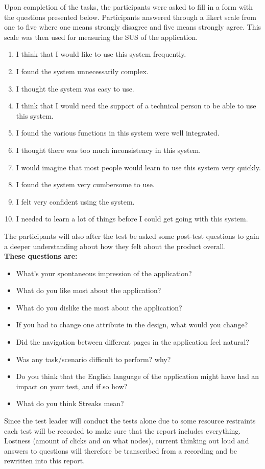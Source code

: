 \noindent Upon completion of the tasks, the participants were asked to fill in a form with the questions presented below. Participants answered through a likert scale from one to five where one means strongly disagree and five means strongly agree. This scale was then used for measuring the SUS of the application. \\ 
\begin{enumerate}
\item I think that I would like to use this system frequently. 
\item I found the system unnecessarily complex. 
\item I thought the system was easy to use. 
\item I think that I would need the support of a technical person to be able to use this system. 
\item I found the various functions in this system were well integrated. 
\item I thought there was too much inconsistency in this system. 
\item I would imagine that most people would learn to use this system very quickly. 
\item I found the system very cumbersome to use. 
\item I felt very confident using the system. 
\item I needed to learn a lot of things before I could get going with this system. \\ 
\end{enumerate}
The participants will also after the test be asked some post-test questions to gain a deeper understanding about how they felt about the product overall. \\ 

\noindent\textbf{These questions are:} 
\begin{itemize}
\item What's your spontaneous impression of the application?
\item What do you like most about the application?
\item What do you dislike the most about the application?
\item If you had to change one attribute in the design, what would you change?
\item Did the navigation between different pages in the application feel natural?
\item Was any task/scenario difficult to perform? why?
\item Do you think that the English language of the application might have had an impact on your test, and if so how? 
\item What do you think Streaks mean? \\
\end{itemize}
\noindent Since the test leader will conduct the tests alone due to some resource restraints each test will be recorded to make sure that the report includes everything. Lostness (amount of clicks and on what nodes), current thinking out loud and answers to questions will therefore be transcribed from a recording and be rewritten into this report. 






